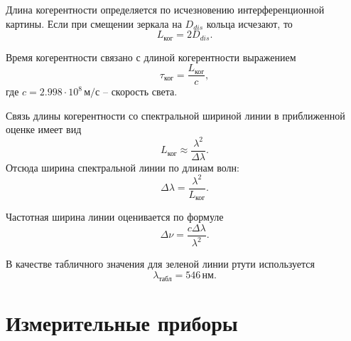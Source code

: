 \documentclass[12pt,a4paper]{article}
\newcommand{\nm}{\ensuremath{\,\text{нм}}}
\begin{document}
Длина когерентности определяется по исчезновению интерференционной картины. Если при смещении зеркала на $D_{dis}$ кольца исчезают, то
\begin{equation}
    L_{\text{ког}} = 2D_{dis}.
    \label{eq:lcoh}
\end{equation}

Время когерентности связано с длиной когерентности выражением
\begin{equation}
    \tau_{\text{ког}} = \frac{L_{\text{ког}}}{c},
    \label{eq:tau}
\end{equation}
где $c = 2.998\cdot 10^8\,\text{м/с}$ -- скорость света.

Связь длины когерентности со спектральной шириной линии в приближенной оценке имеет вид
\begin{equation}
    L_{\text{ког}} \approx \frac{\lambda^2}{\Delta\lambda}.
\end{equation}
Отсюда ширина спектральной линии по длинам волн:
\begin{equation}
    \Delta\lambda = \frac{\lambda^2}{L_{\text{ког}}}.
    \label{eq:deltalambda}
\end{equation}

Частотная ширина линии оценивается по формуле
\begin{equation}
    \Delta\nu = \frac{c\Delta\lambda}{\lambda^2}.
    \label{eq:deltanu}
\end{equation}

В качестве табличного значения для зеленой линии ртути используется
\begin{equation}
    \lambda_{\text{табл}} = 546\nm.
\end{equation}

\section{Измерительные приборы}
\end{document}
